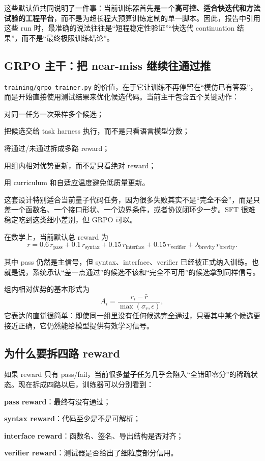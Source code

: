 \documentclass[11pt,a4paper]{article}
\newcommand{\code}[1]{\begingroup\ttfamily\footnotesize\nolinkurl{#1}\endgroup}
\begin{document}
这些默认值共同说明了一件事：当前训练器首先是一个\textbf{高可控、适合快迭代和方法试验的工程平台}，而不是为超长程大预算训练定制的单一脚本。因此，报告中引用这些 run 时，最准确的说法往往是“短程稳定性验证”“快迭代 continuation 结果”，而不是“最终极限训练结论”。

\subsection{GRPO 主干：把 near-miss 继续往通过推}

\code{training/grpo_trainer.py} 的价值，在于它让训练不再停留在“模仿已有答案”，而是开始直接使用测试结果来优化候选代码。当前主干包含五个关键动作：

  \par 对同一任务一次采样多个候选；
  \par 把候选交给 task harness 执行，而不是只看语言模型分数；
  \par 将通过/未通过拆成多路 reward；
  \par 用组内相对优势更新，而不是只看绝对 reward；
  \par 用 curriculum 和自适应温度避免低质量更新。

这套设计特别适合当前量子代码任务，因为很多失败其实不是“完全不会”，而是只差一个函数名、一个接口形状、一个边界条件，或者协议闭环少一步。SFT 很难稳定吃到这类细小差别，但 GRPO 可以。

在数学上，当前默认总 reward 为
\[
r = 0.6\,r_{\mathrm{pass}} + 0.1\,r_{\mathrm{syntax}} + 0.15\,r_{\mathrm{interface}} + 0.15\,r_{\mathrm{verifier}} + \lambda_{\mathrm{brevity}}\,r_{\mathrm{brevity}}.
\]

其中 pass 仍然是主信号，但 syntax、interface、verifier 已经被正式纳入训练。也就是说，系统承认“差一点通过”的候选不该和“完全不可用”的候选拿到同样信号。

组内相对优势的基本形式为
\[
A_i = \frac{r_i - \bar{r}}{\max(\sigma_r,\epsilon)},
\]
它表达的直觉很简单：即使同一组里没有任何候选完全通过，只要其中某个候选更接近正确，它仍然能给模型提供有效学习信号。

\subsection{为什么要拆四路 reward}

如果 reward 只有 pass/fail，当前很多量子任务几乎会陷入“全错即零分”的稀疏状态。现在拆成四路以后，训练器可以分别看到：

  \par \textbf{pass reward}：最终有没有通过；
  \par \textbf{syntax reward}：代码至少是不是可解析；
  \par \textbf{interface reward}：函数名、签名、导出结构是否对齐；
  \par \textbf{verifier reward}：测试器是否给出了细粒度部分信用。
\end{document}
